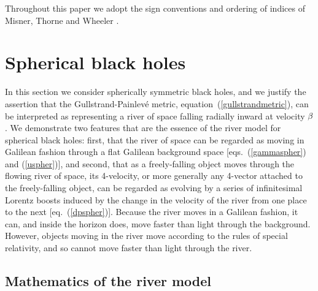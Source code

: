 \documentclass[twocolumn,showpacs,preprintnumbers,amsmath,amssymb,prb]{revtex4}
\begin{document}
Throughout this paper we adopt the sign conventions
and ordering of indices of
Misner, Thorne and Wheeler \cite{MTW}.

\section{Spherical black holes}
\label{spherical}

In this section we consider spherically symmetric black holes,
and we justify the assertion
that the Gullstrand-Painlev\'e metric, equation~(\ref{gullstrandmetric}),
can be interpreted as representing a river of space falling radially inward
at velocity $\beta$.
We demonstrate two features that are the essence of the river model
for spherical black holes:
first, that the river of space can be regarded as moving in Galilean fashion
through a flat Galilean background space
[eqs.~(\ref{gammaspher}) and (\ref{uspher})],
and second,
that as a freely-falling object moves through the flowing river of space,
its 4-velocity,
or more generally any 4-vector attached to the freely-falling object,
can be regarded as evolving by a series of infinitesimal Lorentz boosts
induced by the change in the velocity of the river from one place to the next
[eq.~(\ref{dpspher})].
Because the river moves in a Galilean fashion,
it can, and inside the horizon does,
move faster than light through the background.
However,
objects moving in the river move according to the rules of special relativity,
and so cannot move faster than light through the river.

\subsection{Mathematics of the river model}
\end{document}
